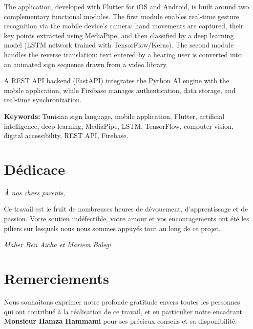 \documentclass[12pt,fleqn,a4paper]{report}
\begin{document}
The application, developed with Flutter for iOS and Android, is built around two complementary functional modules. The first module enables real-time gesture recognition via the mobile device's camera: hand movements are captured, their key points extracted using MediaPipe, and then classified by a deep learning model (LSTM network trained with TensorFlow/Keras). The second module handles the reverse translation: text entered by a hearing user is converted into an animated sign sequence drawn from a video library.

A REST API backend (FastAPI) integrates the Python AI engine with the mobile application, while Firebase manages authentication, data storage, and real-time synchronization.

\bigskip
\textbf{Keywords:} Tunisian sign language, mobile application, Flutter, artificial intelligence, deep learning, MediaPipe, LSTM, TensorFlow, computer vision, digital accessibility, REST API, Firebase.

\chapter*{Dédicace}
\begin{center}
\textit{À nos chers parents,}
\end{center}
\medskip
Ce travail est le fruit de nombreuses heures de dévouement, d'apprentissage et de passion. Votre soutien indéfectible, votre amour et vos encouragements ont été les piliers sur lesquels nous nous sommes appuyés tout au long de ce projet.
\vspace{2cm}
\begin{flushright}
\textit{Maher Ben Aicha et Mariem Balegi}
\end{flushright}

\chapter*{Remerciements}
Nous souhaitons exprimer notre profonde gratitude envers toutes les personnes qui ont contribué à la réalisation de ce travail, et en particulier notre encadrant \textbf{Monsieur Hamza Hammami} pour ses précieux conseils et sa disponibilité.

\dominitoc
\tableofcontents
\adjustmtc
\cleardoublepage
\listoffigures
\cleardoublepage
\listoftables
\cleardoublepage
\end{document}
